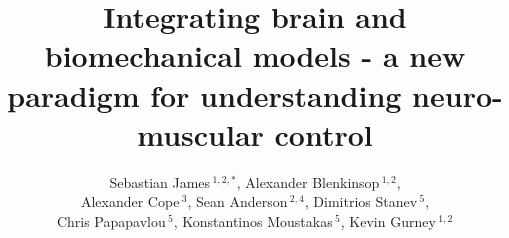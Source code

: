 \documentclass{frontiersSCNS}
\def\firstAuthorLast{James {et~al.}}
\def\Authors{Sebastian James\,$^{1,2,*}$, Alexander Blenkinsop\,$^{1,2}$, \\
  Alexander Cope\,$^3$, Sean Anderson\,$^{2,4}$, Dimitrios Stanev\,$^5$, \\
  Chris Papapavlou\,$^5$, Konstantinos Moustakas\,$^5$, Kevin Gurney\,$^{1,2}$}
\begin{document}


\onecolumn
{}

\title[Integrated brain and biomechanics]{
Integrating brain and biomechanical models - a new paradigm
for understanding  neuro-muscular control
}

\author[\firstAuthorLast ]{\Authors}
\address{}
\correspondance{}
\extraAuth{} %
%
\maketitle
\end{document}
